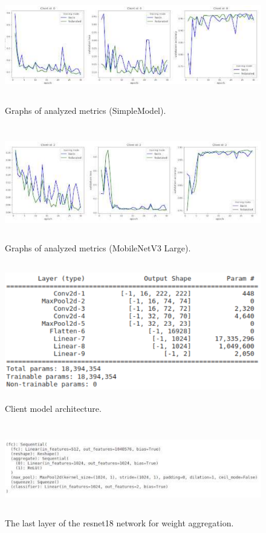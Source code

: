 \documentclass[twotcolumn]{scndocument}
\begin{document}
\begin{figure}[H]
  \centering
    \includegraphics[width=17cm,height=5cm]{image5.png}
  \caption{ Graphs of analyzed metrics (SimpleModel).}
\end{figure} 
\begin{figure}[H]
  \centering
    \includegraphics[width=17cm,height=5cm]{image6.png}
  \caption{Graphs of analyzed metrics (MobileNetV3 Large).}
\end{figure} 
\begin{figure}[H]
  \centering
    \includegraphics[width=12cm,height=6cm]{image7.png}
  \caption{Client model architecture.}
\end{figure} 
\begin{figure}[H]
  \centering
    \includegraphics[width=16cm,height=4cm]{image8.png}
  \caption{The last layer of the resnet18 network for weight aggregation.}
\end{figure} 
\end{document}
